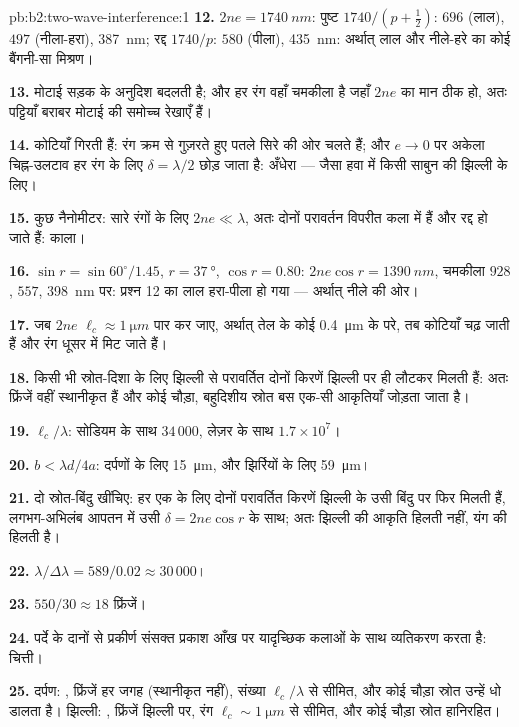 \begin{solution}{pb:b2:two-wave-interference:1}
\textbf{12.} $2ne = \qty{1740}{nm}$: पुष्ट $1740/(p + \tfrac12)$: $696$ (लाल), $497$
(नीला-हरा), \qty{387}{nm}; रद्द $1740/p$: $580$ (पीला), \qty{435}{nm}:
अर्थात् लाल और नीले-हरे का कोई बैंगनी-सा मिश्रण।

\textbf{13.} मोटाई सड़क के अनुदिश बदलती है; और हर रंग वहाँ चमकीला है
जहाँ $2ne$ का मान ठीक हो, अतः पट्टियाँ बराबर मोटाई की समोच्च
रेखाएँ हैं।

\textbf{14.} कोटियाँ गिरती हैं: रंग क्रम से गुज़रते हुए पतले सिरे की ओर
चलते हैं; और $e \to 0$ पर अकेला चिह्न-उलटाव हर रंग के लिए
$\delta = \lambda/2$ छोड़ जाता है: अँधेरा --- जैसा हवा में किसी साबुन की झिल्ली के लिए।

\textbf{15.} कुछ नैनोमीटर: सारे रंगों के लिए $2ne \ll \lambda$, अतः दोनों
परावर्तन विपरीत कला में हैं और रद्द हो जाते हैं: काला।

\textbf{16.} $\sin r = \sin60^\circ/1.45$, $r = \qty{37}{\degree}$, $\cos r = 0.80$: $2ne\cos r
= \qty{1390}{nm}$, चमकीला $928$, $557$, \qty{398}{nm} पर: प्रश्न 12 का लाल
हरा-पीला हो गया --- अर्थात् नीले की ओर।

\textbf{17.} जब $2ne$ $\ell_c \approx \qty{1}{\micro m}$ पार कर जाए, अर्थात् तेल के कोई
\qty{0.4}{\micro m} के परे, तब कोटियाँ चढ़ जाती हैं और रंग धूसर में मिट जाते हैं।

\textbf{18.} किसी भी स्रोत-दिशा के लिए झिल्ली से परावर्तित दोनों किरणें
झिल्ली पर ही लौटकर मिलती हैं: अतः फ्रिंजें वहीं स्थानीकृत हैं और
कोई चौड़ा, बहुदिशीय स्रोत बस एक-सी आकृतियाँ जोड़ता जाता है।

\textbf{19.} $\ell_c/\lambda$: सोडियम के साथ $34\,000$, लेज़र के साथ $1.7 \times 10^7$।

\textbf{20.} $b < \lambda d/4a$: दर्पणों के लिए \qty{15}{\micro m}, और झिर्रियों के लिए
\qty{59}{\micro m}।

\textbf{21.} दो स्रोत-बिंदु खींचिए: हर एक के लिए दोनों परावर्तित किरणें
झिल्ली के उसी बिंदु पर फिर मिलती हैं, लगभग-अभिलंब आपतन में उसी $\delta = 2ne\cos r$
के साथ; अतः झिल्ली की आकृति हिलती नहीं, यंग की हिलती है।

\textbf{22.} $\lambda/\Delta\lambda = 589/0.02 \approx 30\,000$।

\textbf{23.} $550/30 \approx 18$ फ्रिंजें।

\textbf{24.} पर्दे के दानों से प्रकीर्ण संसक्त प्रकाश आँख पर
यादृच्छिक कलाओं के साथ व्यतिकरण करता है: चित्ती।

\textbf{25.} दर्पण: , फ्रिंजें हर जगह
(स्थानीकृत नहीं), संख्या $\ell_c/\lambda$ से सीमित, और कोई चौड़ा स्रोत उन्हें
धो डालता है। झिल्ली: , फ्रिंजें झिल्ली पर, रंग
$\ell_c \sim \qty{1}{\micro m}$ से सीमित, और कोई चौड़ा स्रोत हानिरहित।
\end{solution}

